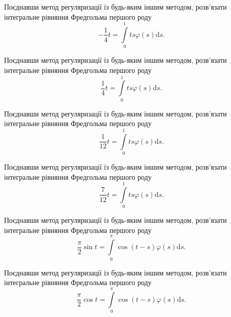 \documentclass[12pt]{extarticle}
\begin{document}
\begin{Exercise}
Поєднавши метод регуляризації із будь-яким іншим методом, розв’язати інтегральне рівняння Фредгольма першого роду \[-\dfrac{1}{4}t = \int\limits_{0}^{1} ts \varphi(s) \mathrm{d}s.\]
\end{Exercise}

\begin{Exercise}
Поєднавши метод регуляризації із будь-яким іншим методом, розв’язати інтегральне рівняння Фредгольма першого роду \[\dfrac{1}{4}t = \int\limits_{0}^{1} ts \varphi(s) \mathrm{d}s.\]
\end{Exercise}

\begin{Exercise}
Поєднавши метод регуляризації із будь-яким іншим методом, розв’язати інтегральне рівняння Фредгольма першого роду \[\dfrac{1}{12}t = \int\limits_{0}^{1} ts \varphi(s) \mathrm{d}s.\]
\end{Exercise}

\begin{Exercise}
Поєднавши метод регуляризації із будь-яким іншим методом, розв’язати інтегральне рівняння Фредгольма першого роду \[\dfrac{7}{12}t = \int\limits_{0}^{1} ts \varphi(s) \mathrm{d}s.\]
\end{Exercise}

\begin{Exercise}
Поєднавши метод регуляризації із будь-яким іншим методом, розв’язати інтегральне рівняння Фредгольма першого роду \[\dfrac{\pi}{2}\sin t = \int\limits_{0}^{\pi} \cos (t-s) \varphi(s) \mathrm{d}s.\]
\end{Exercise}

\begin{Exercise}
Поєднавши метод регуляризації із будь-яким іншим методом, розв’язати інтегральне рівняння Фредгольма першого роду \[\dfrac{\pi}{2}\cos t = \int\limits_{0}^{\pi} \cos (t-s) \varphi(s) \mathrm{d}s.\]
\end{Exercise}
\end{document}
